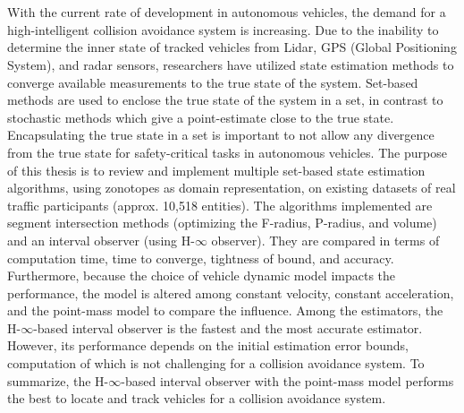 \chapter{\abstractname}
With the current rate of development in autonomous vehicles, the demand for a high-intelligent collision avoidance system is increasing. Due to the inability to determine the inner state of tracked vehicles from Lidar, GPS (Global Positioning System), and radar sensors, researchers have utilized state estimation methods to converge available measurements to the true state of the system. Set-based methods are used to enclose the true state of the system in a set, in contrast to stochastic methods which give a point-estimate close to the true state. Encapsulating the true state in a set is important to not allow any divergence from the true state for safety-critical tasks in autonomous vehicles. The purpose of this thesis is to review and implement multiple set-based state estimation algorithms, using zonotopes as domain representation, on existing datasets of real traffic participants (approx. 10,518 entities). The algorithms implemented are segment intersection methods (optimizing the F-radius, P-radius, and volume) and an interval observer (using H-$\infty$ observer). They are compared in terms of computation time, time to converge, tightness of bound, and accuracy. Furthermore, because the choice of vehicle dynamic model impacts the performance, the model is altered among constant velocity, constant acceleration, and the point-mass model to compare the influence. Among the estimators, the H-$\infty$-based interval observer is the fastest and the most accurate estimator. However, its performance depends on the initial estimation error bounds, computation of which is not challenging for a collision avoidance system. To summarize, the H-$\infty$-based interval observer with the point-mass model performs the best to locate and track vehicles for a collision avoidance system.